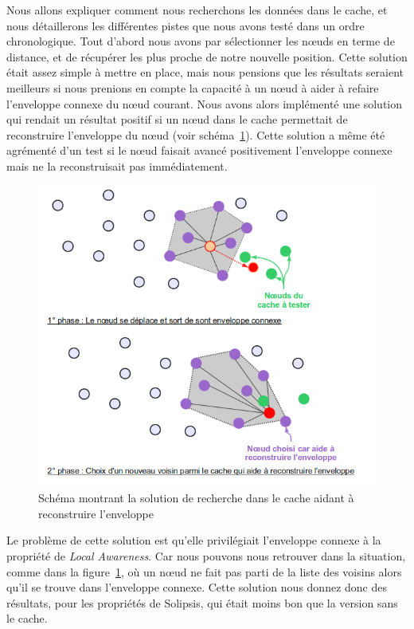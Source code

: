 Nous allons expliquer comment nous recherchons les données dans le cache, et nous détaillerons les différentes pistes que nous avons testé dans un ordre chronologique. Tout d'abord nous avons par sélectionner les nœuds en terme de distance, et de récupérer les plus proche de notre nouvelle position. Cette solution était assez simple à mettre en place, mais nous pensions que les résultats seraient meilleurs si nous prenions en compte la capacité à un nœud à aider à refaire l'enveloppe connexe du nœud courant. Nous avons alors implémenté une solution qui rendait un résultat positif si un nœud dans le cache permettait de reconstruire l'enveloppe du nœud (voir schéma~\ref{schemaEnvelopCache}). Cette solution a même été agrémenté d'un test si le nœud faisait avancé positivement l'enveloppe connexe mais ne la reconstruisait pas immédiatement.

	\begin{figure}[!h]
        \centering
        \includegraphics[scale=0.45]{./Ressources/Images/cacheReconstructEnvelop.png}
        \caption{Schéma montrant la solution de recherche dans le cache aidant à reconstruire l'enveloppe}
        \label{schemaEnvelopCache}
        \end{figure}
\par Le problème de cette solution est qu'elle privilégiait l'enveloppe connexe à la propriété de \textit{Local Awareness}. Car nous pouvons nous retrouver dans la situation, comme dans la figure~\ref{schemaEnvelopCache}, où un nœud ne fait pas parti de la liste des voisins alors qu'il se trouve dans l'enveloppe connexe. Cette solution nous donnez donc des résultats, pour les propriétés de Solipsis, qui était moins bon que la version sans le cache.  

